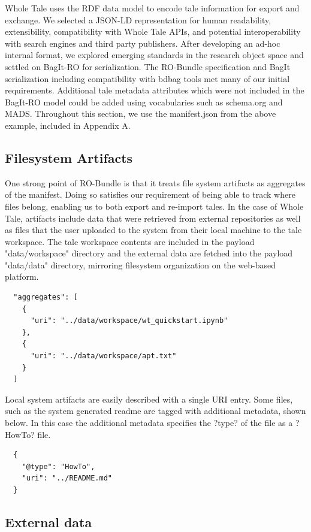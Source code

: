 \documentclass[conference]{IEEEtran}
\begin{document}
Whole Tale uses the RDF data model to encode tale information for export and exchange. We selected 
a JSON-LD representation for human readability, extensibility, compatibility with Whole Tale APIs, 
and potential interoperability with search engines and third party publishers. After developing an 
ad-hoc internal format, we explored emerging standards in the research object space and settled on 
BagIt-RO for serialization. The RO-Bundle specification and BagIt serialization including 
compatibility with bdbag tools met many of our initial requirements.  Additional tale metadata 
attributes which were not included in the BagIt-RO model could be added using vocabularies such as 
schema.org and MADS.  Throughout this section, we use the manifest.json from the above example, 
included in Appendix A.

\subsection{Filesystem Artifacts}
One strong point of RO-Bundle is that it treats file system artifacts as aggregates of the 
manifest. Doing so satisfies our requirement of being able to track where files belong, enabling 
us to both export and re-import tales. In the case of Whole Tale, artifacts include data that were 
retrieved from external repositories as well as files that the user uploaded to the system from 
their local machine to the tale workspace. The tale workspace contents are included in the payload 
"data/workspace" directory and the external data are fetched into the payload "data/data" 
directory, mirroring filesystem organization on the web-based platform.

\begin{lstlisting}
  "aggregates": [
    {
      "uri": "../data/workspace/wt_quickstart.ipynb"
    },
    {
      "uri": "../data/workspace/apt.txt"
    }
  ]
\end{lstlisting}

Local system artifacts are easily described with a single URI entry. Some files, such as the 
system generated readme are tagged with additional metadata, shown below. In this case the 
additional metadata specifies the ?type? of the file as a ?HowTo? file.

\begin{lstlisting}
  {
    "@type": "HowTo",
    "uri": "../README.md"
  }
\end{lstlisting}

\subsection{External data}
\end{document}
